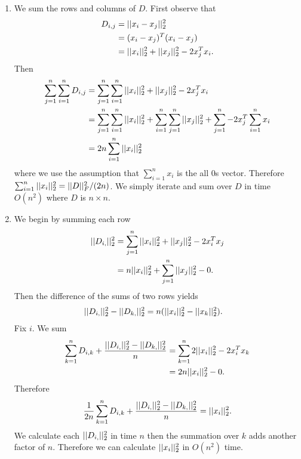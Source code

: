 \begin{enumerate}
    \item We sum the rows and columns of $D$.
    First observe that
    \begin{align}
        D_{i,j} &= ||x_i - x_j||_2^2 \nonumber \\
        &= (x_i - x_j)^T (x_i - x_j) \nonumber \\
        &= ||x_i||_2^2 + ||x_j||_2^2 - 2 x_j^T x_i \nonumber.
    \end{align}
    Then
    \begin{align}
        \sum_{j=1}^n \sum_{i=1}^n D_{i,j} &=
        \sum_{j=1}^n \sum_{i=1}^n ||x_i||_2^2 + ||x_j||_2^2
        - 2x_j^T x_i \nonumber \\
        &= \sum_{j=1}^n \sum_{i=1}^n ||x_i||_2^2 +
        \sum_{i=1}^n \sum_{j=1}^n ||x_j||_2^2 +
        \sum_{j=1}^n -2 x_j^T \sum_{i=1}^n x_i \nonumber \\
        &= 2n \sum_{i=1}^n ||x_i||_2^2
        \nonumber
    \end{align}
    where we use the assumption that $\sum_{i=1}^n x_i$
    is the all 0s vector.
    Therefore $\sum_{i=1}^n ||x_i||_2^2 = ||D||_F^2 / (2n)$.
    We simply iterate and sum over $D$ in time $O(n^2)$ where
    $D$ is $n\times n$.

    \item 
    We begin by summing each row
    \begin{align}
        ||D_{i,}||_2^2 &= \sum_{j=1}^n ||x_i||_2^2 + ||x_j||_2^2
        - 2 x_i^T x_j \nonumber \\
        &= n ||x_i||_2^2 + \sum_{j=1}^n ||x_j||_2^2 - 0.
        \nonumber
    \end{align}
    Then the difference of the sums of two rows yields
    \begin{align}
        ||D_{i,}||_2^2 - ||D_{k,}||_2^2 &= 
        n (||x_i||_2^2 - ||x_k||_2^2).
        \nonumber
    \end{align}
    Fix $i$. We sum
    \begin{align}
        \sum_{k=1}^n D_{i,k} + \frac{||D_{i,}||_2^2 - ||D_{k,}||_2^2}{n}
        &= \sum_{k=1}^n 2 ||x_i||_2^2 - 2 x_{i}^Tx_k \nonumber \\
        &= 2n ||x_i||_2^2 - 0.
        \nonumber
    \end{align} 
    Therefore
    \begin{align}
        \frac{1}{2n}
        \sum_{k=1}^n D_{i,k} + \frac{||D_{i,}||_2^2 - ||D_{k,}||_2^2}{n}
        = ||x_i||_2^2.
        \nonumber
    \end{align}
    We calculate each $||D_{i,}||_2^2$ in time $n$
    then the summation over $k$ adds another factor of $n$.
    Therefore we can calculate $||x_i||_2^2$ in $O(n^2)$ time.


\end{enumerate}
